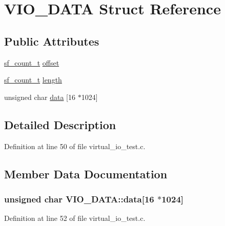 \hypertarget{struct_v_i_o___d_a_t_a}{}\section{V\+I\+O\+\_\+\+D\+A\+TA Struct Reference}
\label{struct_v_i_o___d_a_t_a}
\subsection*{Public Attributes}
\begin{DoxyCompactItemize}
\item 
\hyperlink{mac_2config_2i386_2lib-src_2libsndfile_2src_2sndfile_8h_a398121a5f562230ea7f772528fff5f84}{sf\+\_\+count\+\_\+t} \hyperlink{struct_v_i_o___d_a_t_a_a0d8d8a08ad9a2abb51d2dfd19bcd16ca}{offset}
\item 
\hyperlink{mac_2config_2i386_2lib-src_2libsndfile_2src_2sndfile_8h_a398121a5f562230ea7f772528fff5f84}{sf\+\_\+count\+\_\+t} \hyperlink{struct_v_i_o___d_a_t_a_aaa9575a667e07227e5a17faa50e44149}{length}
\item 
unsigned char \hyperlink{struct_v_i_o___d_a_t_a_ab1df0481179f621fa0e8a014a3a37893}{data} \mbox{[}16 $\ast$1024\mbox{]}
\end{DoxyCompactItemize}


\subsection{Detailed Description}


Definition at line 50 of file virtual\+\_\+io\+\_\+test.\+c.



\subsection{Member Data Documentation}
\subsubsection[{\texorpdfstring{data}{data}}]{\setlength{\rightskip}{0pt plus 5cm}unsigned char V\+I\+O\+\_\+\+D\+A\+T\+A\+::data\mbox{[}16 $\ast$1024\mbox{]}}\hypertarget{struct_v_i_o___d_a_t_a_ab1df0481179f621fa0e8a014a3a37893}{}\label{struct_v_i_o___d_a_t_a_ab1df0481179f621fa0e8a014a3a37893}


Definition at line 52 of file virtual\+\_\+io\+\_\+test.\+c.

